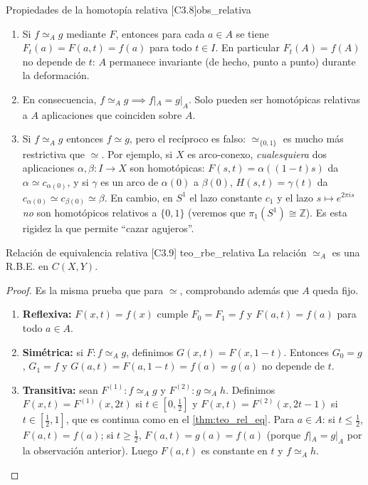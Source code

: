 \begin{observacion}{Propiedades de la homotopía relativa [C3.8]}{obs_relativa}
\begin{enumerate}
    \item Si $f \simeq_A g$ mediante $F$, entonces para cada $a \in A$ se tiene $F_t(a) = F(a,t) = f(a)$ para todo $t \in I$. En particular $F_t(A) = f(A)$ no depende de $t$: $A$ permanece invariante (de hecho, punto a punto) durante la deformación.
    \item En consecuencia, $f \simeq_A g \implies f|_A = g|_A$. Solo pueden ser homotópicas relativas a $A$ aplicaciones que coinciden sobre $A$.
    \item Si $f \simeq_A g$ entonces $f \simeq g$, pero el recíproco es falso: $\simeq_{\{0,1\}}$ es mucho más restrictiva que $\simeq$. Por ejemplo, si $X$ es arco-conexo, \emph{cualesquiera} dos aplicaciones $\alpha, \beta \colon I \to X$ son homotópicas: $F(s,t) = \alpha((1-t)s)$ da $\alpha \simeq c_{\alpha(0)}$, y si $\gamma$ es un arco de $\alpha(0)$ a $\beta(0)$, $H(s,t) = \gamma(t)$ da $c_{\alpha(0)} \simeq c_{\beta(0)} \simeq \beta$. En cambio, en $S^1$ el lazo constante $c_1$ y el lazo $s \mapsto e^{2\pi i s}$ \emph{no} son homotópicos relativos a $\{0,1\}$ (veremos que $\pi_1(S^1) \cong \mathbb{Z}$). Es esta rigidez la que permite ``cazar agujeros''.
\end{enumerate}
\end{observacion}

\begin{teorema}{Relación de equivalencia relativa [C3.9] \marcaT \marcaE}{teo_rbe_relativa}
La relación $\simeq_A$ es una R.B.E. en $C(X,Y)$. 
\end{teorema}

\begin{proof}
Es la misma prueba que para $\simeq$, comprobando además que $A$ queda fijo.
\begin{enumerate}
    \item \textbf{Reflexiva:} $F(x,t) = f(x)$ cumple $F_0 = F_1 = f$ y $F(a,t) = f(a)$ para todo $a \in A$.
    \item \textbf{Simétrica:} si $F \colon f \simeq_A g$, definimos $G(x,t) = F(x,1-t)$. Entonces $G_0 = g$, $G_1 = f$ y $G(a,t) = F(a,1-t) = f(a) = g(a)$ no depende de $t$.
    \item \textbf{Transitiva:} sean $F^{(1)} \colon f \simeq_A g$ y $F^{(2)} \colon g \simeq_A h$. Definimos $F(x,t) = F^{(1)}(x,2t)$ si $t \in [0,\frac12]$ y $F(x,t) = F^{(2)}(x,2t-1)$ si $t \in [\frac12,1]$, que es continua como en el \cref{thm:teo_rel_eq}. Para $a \in A$: si $t \le \frac12$, $F(a,t) = f(a)$; si $t \ge \frac12$, $F(a,t) = g(a) = f(a)$ (porque $f|_A = g|_A$ por la observación anterior). Luego $F(a,t)$ es constante en $t$ y $f \simeq_A h$.
\end{enumerate}
\end{proof}

